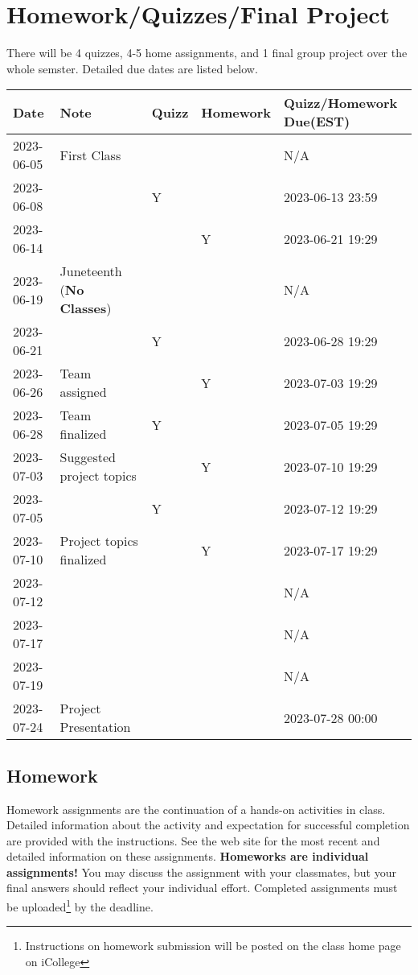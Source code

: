 \documentclass{article}
\begin{document}
\section{Homework/Quizzes/Final Project}
There will be 4 quizzes, 4-5 home assignments, and 1 final group project over the whole semster. Detailed due dates are listed below.
\begin{center}
	\begin{tabular}{lllll}
		\hline
		Date & Note & Quizz & Homework & Quizz/Homework Due(EST) \\
		\hline
		2023-06-05 & First Class &  &  & N/A \\
        2023-06-08 & & Y & & 2023-06-13 23:59 \\
        2023-06-14 &  &  & Y & 2023-06-21 19:29 \\
        2023-06-19 & Juneteenth (\textbf{No Classes})  &  &  &  N/A\\
        2023-06-21 &  & Y &  & 2023-06-28 19:29 \\
        2023-06-26 & Team assigned &  & Y & 2023-07-03 19:29 \\
        2023-06-28 & Team finalized  & Y &  & 2023-07-05 19:29 \\
        2023-07-03 & Suggested project topics &  & Y & 2023-07-10 19:29 \\
        2023-07-05 &  & Y &  & 2023-07-12 19:29 \\
        2023-07-10 & Project topics finalized &  & Y & 2023-07-17 19:29 \\
        2023-07-12 &  &  &  &  N/A\\
        2023-07-17 &  &  &  &  N/A\\
        2023-07-19 &  &  &  &  N/A\\
		2023-07-24 & Project Presentation &  &  & 2023-07-28 00:00\\
		\hline        
	\end{tabular}
\end{center}



\subsection{Homework}
Homework assignments are the continuation of a hands-on activities in class. Detailed information about the activity and expectation for successful completion are provided with the instructions. See the web site for the most recent and detailed information on these assignments. \textbf{Homeworks are individual assignments!} You may discuss the assignment with your classmates, but your ﬁnal answers should reﬂect your individual eﬀort. Completed assignments must be uploaded\footnote{Instructions on homework submission will be posted on the class home page on iCollege} by the deadline.
\end{document}
